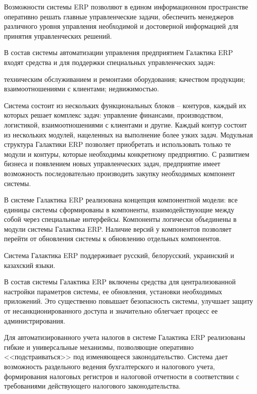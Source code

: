 \documentclass[14pt,a4paper]{reportmod}
\begin{document}
Возможности системы ERP позволяют в едином информационном пространстве оперативно решать главные управленческие задачи, обеспечить менеджеров различного уровня управления необходимой и достоверной информацией для принятия управленческих решений.


В состав системы автоматизации управления предприятием Галактика ERP входят средства и для поддержки специальных управленческих задач:
\begin{itemize}
   техническим обслуживанием и ремонтами оборудования;
   качеством продукции;
   взаимоотношениями с клиентами;
   недвижимостью.
\end{itemize}


Система состоит из нескольких функциональных блоков – контуров, каждый их которых решает комплекс задач: управление финансами, производством, логистикой, взаимоотношениями с клиентами и другие. Каждый контур состоит из нескольких модулей, нацеленных на выполнение более узких задач. Модульная структура Галактики ERP позволяет приобретать и использовать только те модули и контуры, которые необходимы конкретному предприятию. С развитием бизнеса и появлением новых управленческих задач, предприятие имеет возможность последовательно производить закупку необходимых компонент системы.


В системе Галактика ERP реализована концепция компонентной модели: все единицы системы сформированы в компоненты, взаимодействующие между собой через специальные интерфейсы. Компоненты логически объединены в модули системы Галактика ERP. Наличие версий у компонентов позволяет перейти от обновления системы к обновлению отдельных компонентов.


Система Галактика ERP поддерживает русский, белорусский, украинский и казахский языки.


В состав системы Галактика ERP включены средства для централизованной настройки параметров системы, ее обновления, установки необходимых приложений. Это существенно повышает безопасность системы, улучшает защиту от несанкционированного доступа и значительно облегчает процесс ее администрирования.


Для автоматизированного учета налогов в системе Галактика ERP реализованы гибкие и универсальные механизмы, позволяющие оперативно <<подстраиваться>> под изменяющееся законодательство. Система дает возможность раздельного ведения бухгалтерского и налогового учета, формирования налоговых регистров и налоговой отчетности в соответствии с требованиями действующего налогового законодательства.
\end{document}
